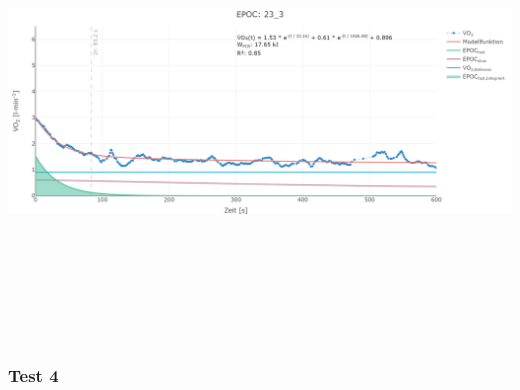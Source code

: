 \documentclass[
  letterpaper,
  DIV=11]{scrartcl}
\begin{document}
\includegraphics[width=11.45833in,height=4.6875in]{images/23_3.png}

\subsubsection{Test 4}
\end{document}
